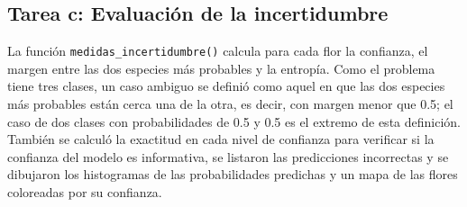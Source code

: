 \documentclass[11pt,letterpaper]{article}
\begin{document}
\subsection{Tarea c: Evaluación de la incertidumbre}

La función \texttt{medidas\_incertidumbre()} calcula para cada flor la confianza, el margen entre las dos especies más probables y la entropía. Como el problema tiene tres clases, un caso ambiguo se definió como aquel en que las dos especies más probables están cerca una de la otra, es decir, con margen menor que 0.5; el caso de dos clases con probabilidades de 0.5 y 0.5 es el extremo de esta definición. También se calculó la exactitud en cada nivel de confianza para verificar si la confianza del modelo es informativa, se listaron las predicciones incorrectas y se dibujaron los histogramas de las probabilidades predichas y un mapa de las flores coloreadas por su confianza.
\end{document}
